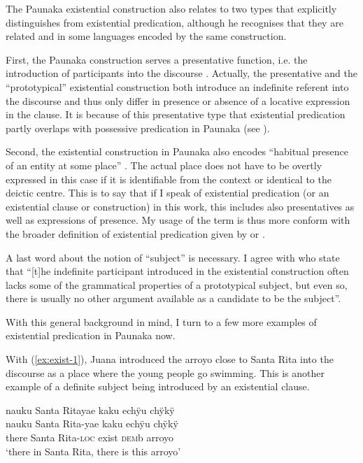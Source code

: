 The Paunaka existential construction also relates to two types that \citet[]{Creissels2014} explicitly distinguishes from existential predication, although he recognises that they are related and in some languages encoded by the same construction.

First, the Paunaka construction serves a presentative function, i.e. the introduction of participants into the discourse \citep[cf.][15]{Creissels2014a}. Actually, the presentative and the “prototypical” existential construction both introduce an indefinite referent into the discourse and thus only differ in presence or absence of a locative expression in the clause. It is because of this presentative type that existential predication partly overlaps with possessive predication in Paunaka (see ). 

Second, the existential construction in Paunaka also encodes “habitual presence of an entity at some place” \citet[14]{Creissels2014a}. The actual place does not have to be overtly expressed in this case if it is identifiable from the context or identical to the deictic centre. This is to say that if I speak of existential predication (or an existential clause or construction) in this work, this includes also presentatives as well as expressions of  presence. My usage of the term is thus more conform with the broader definition of existential predication given by \citet[123--125]{Payne1997} or \citet[240--244]{Dryer2007}.  

A last word about the notion of “subject” is necessary. I agree with \citet[9]{Overall2018} who state that “[t]he indefinite participant introduced in the existential construction often lacks some of the grammatical properties of a prototypical subject, but even so, there is usually no other argument available as a candidate to be the subject”.

With this general background in mind, I turn to a few more examples of existential predication in Paunaka now.

With (\ref{ex:exist-1}), Juana introduced the arroyo close to Santa Rita into the discourse as a place where the young people go swimming. This is another example of a definite subject being introduced by an existential clause.

\ea\label{ex:exist-1}
\begingl 
\glpreamble nauku Santa Ritayae kaku echÿu chÿkÿ\\
\gla nauku {Santa Rita}-yae kaku echÿu chÿkÿ\\ 
\glb there {Santa Rita}-\textsc{loc} exist \textsc{dem}b arroyo\\ 
\glft ‘there in Santa Rita, there is this arroyo’\\ 
\endgl
\trailingcitation{[jxx-a120516l-a.571]}
\xe
{}

